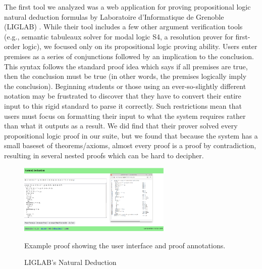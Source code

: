 \documentclass[ms]{uncgdissertationexp2}
\theoremstyle{plain}
\theoremstyle{definition}
\theoremstyle{remark}
\begin{document}
The first tool we analyzed was a web application for proving propositional logic natural deduction formulas by Laboratoire d'Informatique de Grenoble (LIGLAB) \cite{teachinglogic}. While their tool includes a few other argument verification tools (e.g., semantic tabuleaux solver for modal logic S4, a resolution prover for first-order logic), we focused only on its propositional logic proving ability. Users enter premises as a series of conjunctions followed by an implication to the conclusion. This syntax follows the standard proof idea which says if all premises are true, then the conclusion must be true (in other words, the premises logically imply the conclusion). Beginning students or those using an ever-so-slightly different notation may be frustrated to discover that they have to convert their entire input to this rigid standard to parse it correctly. Such restrictions mean that users must focus on formatting their input to what the system requires rather than what it outputs as a result. We did find that their prover solved every propositional logic proof in our suite, but we found that because the system has a small baseset of theorems/axioms, almost every proof is a proof by contradiction, resulting in several nested proofs which can be hard to decipher.
\begin{figure}[!ht]
	\centering
	\includegraphics[width=0.65\textwidth]{teachinglogic.png}
	\caption{LIGLAB's Natural Deduction}{Example proof showing the user interface and proof annotations.}
	\label{fig:liglab}
\end{figure} 
\end{document}

